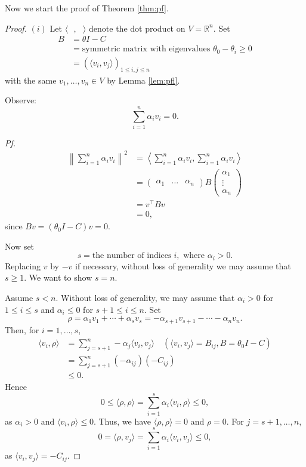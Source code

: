\documentclass[
]{book}
\theoremstyle{definition}
\theoremstyle{definition}
\theoremstyle{definition}
\theoremstyle{definition}
\theoremstyle{remark}
\begin{document}
Now we start the proof of Theorem \ref{thm:pf}.

\begin{proof}
\((i)\) Let \(\langle \text{ }, \text{ }\rangle\) denote the dot product on \(V = \mathbb{R}^n\). Set
\begin{align}
B & = \theta I - C\\
  & = \textrm{symmetric matrix with eigenvalues }\theta_0 - \theta_i \geq 0\\
  & = (\langle v_i, v_j\rangle)_{1\leq i,j\leq n}
\end{align}
with the same \(v_1, \ldots, v_n \in V\) by Lemma \ref{lem:pfl}.

Observe:
\[\sum_{i = 1}^n \alpha_iv_i = 0.\]

\emph{Pf.}
\begin{align}
\left\|\sum_{i = 1}^n \alpha_iv_i\right\|^2 & = \left\langle \sum_{i=1}^n\alpha_iv_i, \sum_{i=1}^n\alpha_iv_i\right\rangle\\
& = \begin{pmatrix} \alpha_1 &\ldots &\alpha_n\end{pmatrix}B\begin{pmatrix} \alpha_1\\\vdots\\\alpha_n\end{pmatrix}\\
& = v^\top Bv\\
& = 0,
\end{align}
since \(Bv = (\theta_0 I - C)v = 0\).

Now set
\[s = \textrm{the number of indices} \; i, \textrm{ where } \alpha_i >0.\]
Replacing \(v\) by \(-v\) if necessary, without loss of generality we may assume that \(s\geq 1\). We want to show \(s = n\).

Assume \(s < n\). Without loss of generality, we may assume that \(\alpha_i >0\) for \(1\leq i\leq s\) and \(\alpha_i \leq 0\) for \(s+1 \leq i \leq n\).
Set
\[ \rho = \alpha_1v_1 + \cdots + \alpha_sv_s = -\alpha_{s+1}v_{s+1} - \cdots - \alpha_nv_n.\]
Then, for \(i = 1,\ldots, s\),
\begin{align}
\langle v_i, \rho \rangle & = \sum_{j = s+1}^n -\alpha_j\langle v_i, v_j\rangle \quad (\langle v_i, v_j\rangle = B_{ij}, B = \theta_0I - C)\\
  & = \sum_{j = s+1}^n (-\alpha_{ij})(-C_{ij})\\
  & \leq 0.
\end{align}
Hence
\[0\leq \langle \rho, \rho\rangle = \sum_{i=1}^s \alpha_i \langle v_i, \rho\rangle \leq 0,\]
as \(\alpha_i > 0\) and \(\langle v_i, \rho\rangle \leq 0\). Thus, we have
\(\langle \rho, \rho \rangle = 0\) and \(\rho = 0\).
For \(j = s+1, \ldots, n\),
\[0 = \langle \rho, v_j\rangle = \sum_{i=1}^s \alpha_i\langle v_i, v_j\rangle \leq 0,\]
as \(\langle v_i, v_j\rangle = -C_{ij}\).


\end{proof}
\end{document}
